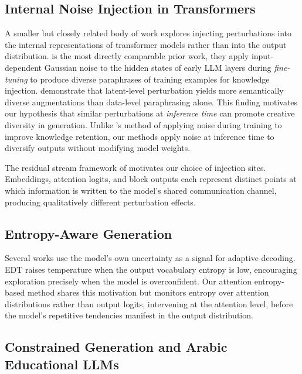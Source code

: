 \documentclass[11pt]{article}
\begin{document}
\subsection{Internal Noise Injection in Transformers}

A smaller but closely related body of work explores injecting perturbations into the internal representations of transformer models rather than into the output distribution. \citet{kang2024lapael} is the most directly comparable prior work, they apply input-dependent Gaussian noise to the hidden states of early LLM layers during \textit{fine-tuning} to produce diverse paraphrases of training examples for
knowledge injection. \citet{kang2024lapael} demonstrate that latent-level perturbation yields more semantically diverse augmentations than data-level paraphrasing alone. This finding motivates our hypothesis that similar perturbations at \textit{inference time} can promote creative diversity in generation. Unlike \citet{kang2024lapael}'s method of applying noise during training to improve knowledge retention, our methods apply noise at inference time to diversify outputs without modifying model weights.

The residual stream framework of \citet{elhage2021mathematical} motivates our choice of injection sites. Embeddings, attention logits, and block outputs each represent distinct points at which information
is written to the model's shared communication channel, producing qualitatively different perturbation effects.

\subsection{Entropy-Aware Generation}

Several works use the model's own uncertainty as a signal for adaptive decoding. EDT \cite{zhang2024edt} raises temperature when the output vocabulary entropy is low, encouraging exploration precisely when the model is overconfident. Our attention entropy-based method shares this motivation but monitors entropy over attention distributions rather than output logits, intervening at the attention level, before the model's repetitive tendencies manifest in the output distribution.


\subsection{Constrained Generation and Arabic Educational LLMs}
\end{document}
